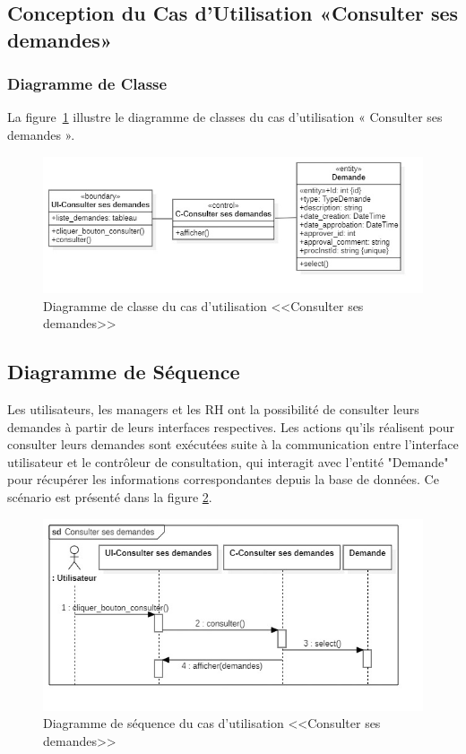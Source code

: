 \subsection{Conception du Cas d'Utilisation «Consulter ses demandes»}
\subsubsection{Diagramme de Classe}
La figure~\ref{fig:Consulter_ses_demandes} illustre le diagramme de classes du cas d'utilisation « Consulter ses demandes ».
\begin{figure}[h]
     \centering
     \includegraphics[width=15cm]{images/C-cdem.jpg}
     \caption{Diagramme de classe du cas d'utilisation <<Consulter ses demandes>>}
     \label{fig:Consulter_ses_demandes}
\end{figure}
\subsection{Diagramme de Séquence}
Les utilisateurs, les managers et les RH ont la possibilité de consulter leurs demandes à partir de leurs interfaces respectives. Les actions qu’ils réalisent pour consulter leurs demandes sont exécutées suite à la communication entre l’interface utilisateur et le contrôleur de consultation, qui interagit avec l’entité "Demande" pour récupérer les informations correspondantes depuis la base de données. Ce scénario est présenté dans la figure \ref{fig:S_Consulter_ses_demandes}.
\begin{figure}[h]
     \centering
     \includegraphics[width=15cm]{images/S-cdem.jpg}
     \caption{Diagramme de séquence du cas d'utilisation <<Consulter ses demandes>>}
     \label{fig:S_Consulter_ses_demandes}
\end{figure}
\newpage
